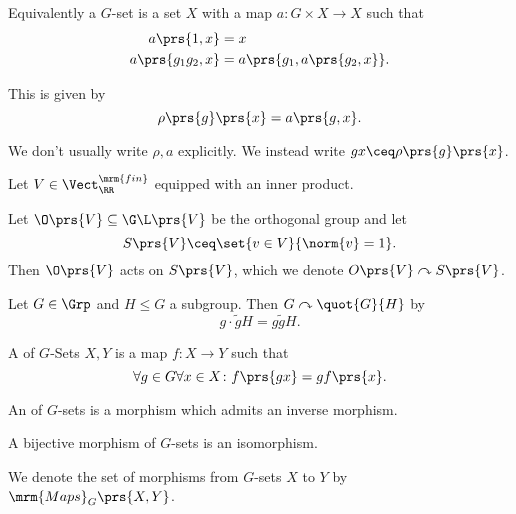 \documentclass[10pt,a4paper,twoside,openany,hidelinks]{book}
\begin{document}
\begin{remark}
Equivalently a $G$-set is a set $X$ with a map $a \colon G \times X \to X$ such that
\begin{align*}
a\prs{1, x} &= x \\
a\prs{g_1 g_2, x} &= a\prs{g_1, a\prs{g_2, x}} \text{.}
\end{align*}

This is given by
\[\rho\prs{g}\prs{x} = a\prs{g, x} \text{.}\]
\end{remark}

\begin{notation}
We don't usually write $\rho, a$ explicitly. We instead write $gx \ceq \rho\prs{g}\prs{x}$.
\end{notation}

\newcommand{\fin}{\mrm{fin}}
\newcommand{\acts}{\curvearrowright}

\begin{example}
Let $V \in \Vect_\RR^{\fin}$ equipped with an inner product.

Let $\O\prs{V} \subseteq \G\L\prs{V}$ be the orthogonal group and let
\[S\prs{V} \ceq \set{v \in V}{\norm{v} = 1} \text{.}\]
Then $\O\prs{V}$ acts on $S\prs{V}$, which we denote
$O\prs{V} \acts S\prs{V}$.
\end{example}

\begin{example}
Let $G \in \Grp$ and $H \leq G$ a subgroup. Then
$G \acts \quot{G}{H}$ by
\[g \cdot \tilde{g} H = g \tilde{g} H \text{.}\]
\end{example}

\begin{definition}
A  of $G$-Sets $X, Y$ is a map $f \colon X \to Y$ such that
\[\forall g \in G \forall x \in X \colon f\prs{gx} = g f\prs{x} \text{.}\]
\end{definition}

\begin{definition}
An  of $G$-sets is a morphism which admits an inverse morphism.
\end{definition}

\begin{exercise}
A bijective morphism of $G$-sets is an isomorphism.
\end{exercise}

\newcommand{\Maps}{\mrm{Maps}}

\begin{notation}
We denote the set of morphisms from $G$-sets $X$ to $Y$ by $\Maps_G\prs{X,Y}$.
\end{notation}
\end{document}
